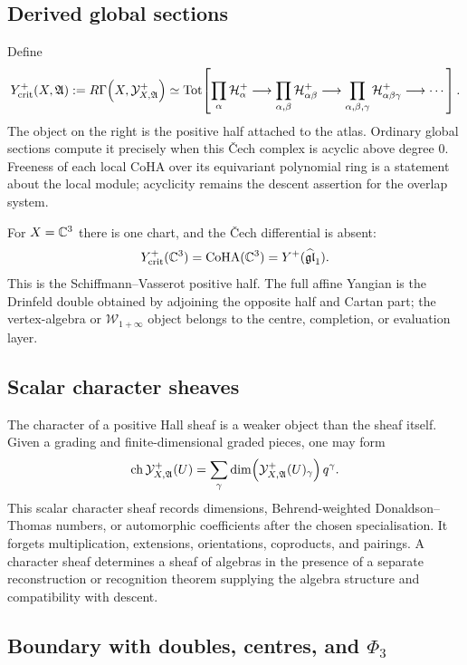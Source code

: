 \subsection*{Derived global sections}

Define
\[
  Y^{+}_{\mathrm{crit}}(X,\mathfrak A)
  :=
  R\Gamma\!\left(X,\mathcal Y^{+}_{X,\mathfrak A}\right)
  \simeq
  \mathrm{Tot}\!
  \left[
    \prod_{\alpha}\mathcal H_{\alpha}^{+}
    \longrightarrow
    \prod_{\alpha,\beta}\mathcal H_{\alpha\beta}^{+}
    \longrightarrow
    \prod_{\alpha,\beta,\gamma}\mathcal H_{\alpha\beta\gamma}^{+}
    \longrightarrow\cdots
  \right].
\]
The object on the right is the positive half attached to the atlas.
Ordinary global sections compute it precisely when this \v{C}ech complex is
acyclic above degree $0$.  Freeness of each local CoHA over its
equivariant polynomial ring is a statement about the local module;
acyclicity remains the descent assertion for the overlap system.

For $X=\mathbb C^{3}$ there is one chart, and the \v{C}ech differential is
absent:
\[
  Y^{+}_{\mathrm{crit}}(\mathbb C^{3})
  =
  \mathrm{CoHA}(\mathbb C^{3})
  =
  Y^{+}(\widehat{\mathfrak{gl}}_{1}).
\]
This is the Schiffmann--Vasserot positive half.  The full affine Yangian
is the Drinfeld double obtained by adjoining the opposite half and
Cartan part; the vertex-algebra or
$\mathcal W_{1+\infty}$ object belongs to the centre, completion, or
evaluation layer.

\subsection*{Scalar character sheaves}

The character of a positive Hall sheaf is a weaker object than the sheaf
itself.  Given a grading and finite-dimensional graded pieces, one may
form
\[
  \operatorname{ch}\mathcal Y^{+}_{X,\mathfrak A}(U)
  =
  \sum_{\gamma}\dim\!\left(\mathcal Y^{+}_{X,\mathfrak A}(U)_{\gamma}\right)q^\gamma .
\]
This scalar character sheaf records dimensions, Behrend-weighted
Donaldson--Thomas numbers, or automorphic coefficients after the chosen
specialisation.  It forgets multiplication, extensions, orientations,
coproducts, and pairings.  A character sheaf determines a sheaf of
algebras in the presence of a separate reconstruction or recognition
theorem supplying the algebra structure and compatibility with descent.

\subsection*{Boundary with doubles, centres, and $\Phi_{3}$}

